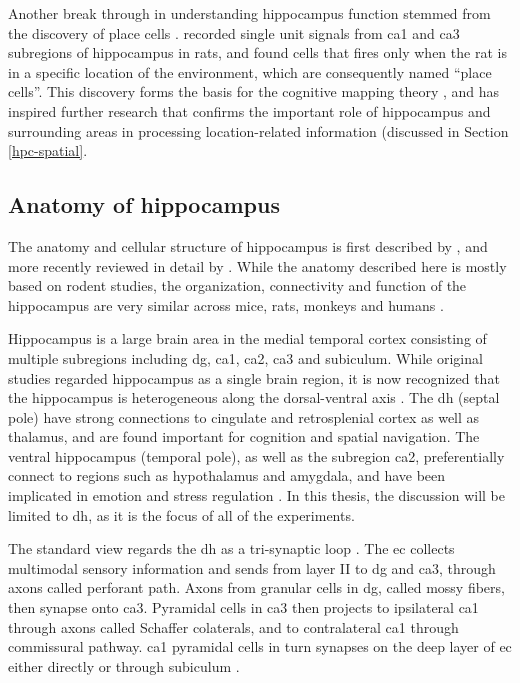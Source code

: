 Another break through in understanding hippocampus function stemmed from the discovery of place cells \citep{o'keefe71}. \citet{o'keefe71} recorded single unit signals from \gls{ca1} and \gls{ca3} subregions of hippocampus in rats, and found cells that fires only when the rat is in a specific location of the environment, which are consequently named ``place cells''. This discovery forms the basis for the cognitive mapping theory \citep{o'keefe76}, and has inspired further research that confirms the important role of hippocampus and surrounding areas in processing location-related information (discussed in Section \ref{hpc-spatial}.

\subsection{Anatomy of hippocampus}
The anatomy and cellular structure of hippocampus is first described by \citet{cajal93}, and more recently reviewed in detail by \citet{strien09}. While the anatomy described here is mostly based on rodent studies, the organization, connectivity and function of the hippocampus are very similar across mice, rats, monkeys and humans \citep{clark13}. 

Hippocampus is a large brain area in the medial temporal cortex consisting of multiple subregions including \gls{dg}, \gls{ca1}, \gls{ca2}, \gls{ca3} and subiculum. While original studies regarded hippocampus as a single brain region, it is now recognized that the hippocampus is heterogeneous along the dorsal-ventral axis \citep{moser98, fanselow10}. The \gls{dh} (septal pole) have strong connections to cingulate and retrosplenial cortex as well as thalamus, and are found important for cognition and spatial navigation. The ventral hippocampus (temporal pole), as well as the subregion \gls{ca2}, preferentially connect to regions such as hypothalamus and amygdala, and have been implicated in emotion and stress regulation \citep{fanselow10, chevaleyre16}. In this thesis, the discussion will be limited to \gls{dh}, as it is the focus of all of the experiments.

The standard view regards the \gls{dh} as a tri-synaptic loop \citep{strien09}. The \gls{ec} collects multimodal sensory information and sends from layer II to \gls{dg} and \gls{ca3}, through axons called perforant path. Axons from granular cells in \gls{dg}, called mossy fibers, then synapse onto \gls{ca3}. Pyramidal cells in \gls{ca3} then projects to ipsilateral \gls{ca1} through axons called Schaffer colaterals, and to contralateral \gls{ca1} through commissural pathway. \gls{ca1} pyramidal cells in turn synapses on the deep layer of \gls{ec} either directly or through subiculum \citep{strien09}.

